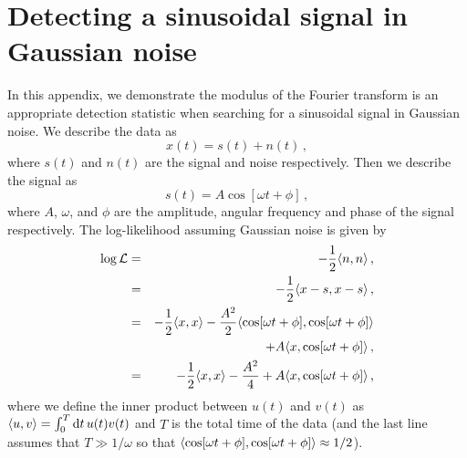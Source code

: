 \documentclass[paper-main.tex]{subfiles}
\begin{document}




\section{Detecting a sinusoidal signal in Gaussian noise}
\label{app:sinusoid_likelihood}
In this appendix, we demonstrate the modulus of the Fourier transform is an appropriate detection statistic when searching for a sinusoidal signal in Gaussian noise. 
We describe the data as
\begin{equation}
x(t) = s(t) + n(t)\,, 
\end{equation}
where $s(t)$ and $n(t)$ are the signal and noise respectively. 
Then we describe the signal as 
\begin{equation}
s(t) = A \cos\left[{\omega t + \phi}\right]\,,
\end{equation}
where $A$, $\omega$, and $\phi$ are the amplitude, angular frequency and phase of the signal respectively. 
The log-likelihood assuming Gaussian noise is given by
\begin{eqnarray}
\log \mathcal{L} &=& -\frac{1}{2}\langle n,n \rangle\,, \\
                 &=& -\frac{1}{2}\langle x-s,x-s \rangle\,, \\ 
                 &=& -\frac{1}{2}\langle x,x \rangle - \frac{A^2}{2} \langle \cos[\omega t + \phi],\cos[\omega t + \phi] \rangle \nonumber\\
                 &&+ A \langle x,\cos[\omega t + \phi] \rangle\,,\\ 
                 &=& -\frac{1}{2}\langle x,x \rangle - \frac{A^2}{4} + A \langle x,\cos[\omega t + \phi] \rangle\,,\label{eqn:logLike}
\end{eqnarray}
where we define the inner product between $u(t)$ and $v(t)$ as $\langle u,v \rangle = \int_0^T \mathrm{d} t \, u(t) v(t) $ and $T$ is the total time of the data (and the last line assumes that $T\gg1/\omega$ so that $\langle \cos[\omega t + \phi],\cos[\omega t + \phi] \rangle\approx{1/2}$). 
\end{document}
